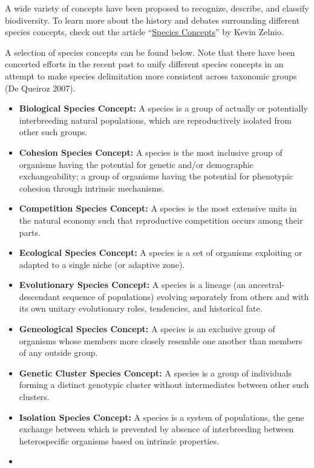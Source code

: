 \documentclass[
]{book}
\begin{document}
A wide variety of concepts have been proposed to recognize, describe, and classify biodiversity. To learn more about the history and debates surrounding different species concepts, check out the article ``\href{https://blogs.scientificamerican.com/evo-eco-lab/species-concepts/}{Species Concepts}'' by Kevin Zelnio.

A selection of species concepts can be found below. Note that there have been concerted efforts in the recent past to unify different species concepts in an attempt to make species delimitation more consistent across taxonomic groups (De Queiroz 2007).

\begin{itemize}
\item
  \textbf{Biological Species Concept:} A species is a group of actually or potentially interbreeding natural populations, which are reproductively isolated from other such groups.
\item
  \textbf{Cohesion Species Concept:} A species is the most inclusive group of organisms having the potential for genetic and/or demographic exchangeability; a group of organisms having the potential for phenotypic cohesion through intrinsic mechanisms.
\item
  \textbf{Competition Species Concept:} A species is the most extensive units in the natural economy such that reproductive competition occurs among their parts.
\item
  \textbf{Ecological Species Concept:} A species is a set of organisms exploiting or adapted to a single niche (or adaptive zone).
\item
  \textbf{Evolutionary Species Concept:} A species is a lineage (an ancestral-descendant sequence of populations) evolving separately from others and with its own unitary evolutionary roles, tendencies, and historical fate.
\item
  \textbf{Geneological Species Concept:} A species is an exclusive group of organisms whose members more closely resemble one another than members of any outside group.
\item
  \textbf{Genetic Cluster Species Concept:} A species is a group of individuals forming a distinct genotypic cluster without intermediates between other such clusters.
\item
  \textbf{Isolation Species Concept:} A species is a system of populations, the gene exchange between which is prevented by absence of interbreeding between heterospecific organisms based on intrinsic properties.
\item

\end{itemize}
\end{document}

